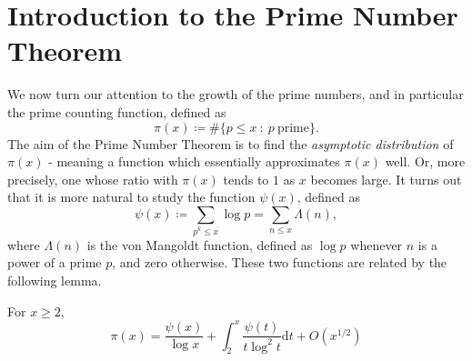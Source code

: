\section{Introduction to the Prime Number Theorem}
We now turn our attention to the growth of the prime numbers, and in particular the prime counting function, defined as
\begin{equation}
    \pi(x) \coloneqq \# \{p \leq x \ : \ p \ \textrm{prime}\}. \nonumber
\end{equation}
The aim of the Prime Number Theorem is to find the \textit{asymptotic distribution} of $\pi(x)$ - meaning a function which essentially approximates $\pi(x)$ well. Or, more precisely, one whose ratio with $\pi(x)$ tends to $1$ as $x$ becomes large. It turns out that it is more natural to study the function $\psi(x)$, defined as 
\begin{equation}
    \psi(x) \coloneqq \sum_{p^{k} \leq x} \log p = \sum_{n \leq x} \Lambda(n), \nonumber
\end{equation}
where $\Lambda(n)$ is the von Mangoldt function, defined as $\log p$ whenever $n$ is a power of a prime $p$, and zero otherwise. These two functions are related by the following lemma.
\begin{lemma}
For $x \geq 2$, 
\begin{equation}
\pi(x) = \frac{\psi(x)}{\log x} + \int_{2}^{x} \frac{\psi(t)}{t \log^{2} t} \mathrm{d} t + O(x^{1/2})
\end{equation}
\end{lemma}
